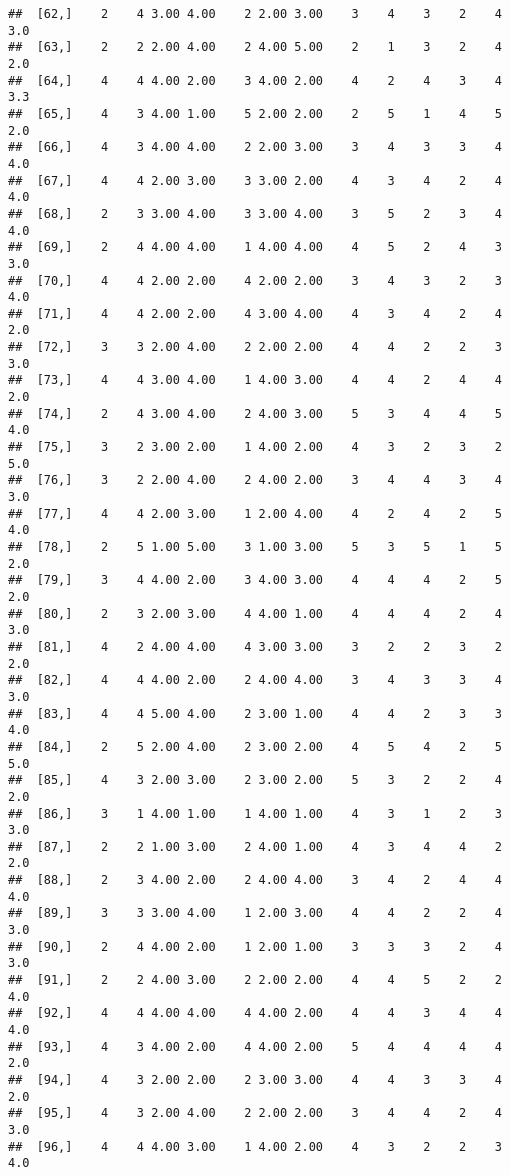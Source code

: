 \documentclass[]{article}
\begin{document}
\begin{verbatim}
##  [62,]    2    4 3.00 4.00    2 2.00 3.00    3    4    3    2    4  3.0
##  [63,]    2    2 2.00 4.00    2 4.00 5.00    2    1    3    2    4  2.0
##  [64,]    4    4 4.00 2.00    3 4.00 2.00    4    2    4    3    4  3.3
##  [65,]    4    3 4.00 1.00    5 2.00 2.00    2    5    1    4    5  2.0
##  [66,]    4    3 4.00 4.00    2 2.00 3.00    3    4    3    3    4  4.0
##  [67,]    4    4 2.00 3.00    3 3.00 2.00    4    3    4    2    4  4.0
##  [68,]    2    3 3.00 4.00    3 3.00 4.00    3    5    2    3    4  4.0
##  [69,]    2    4 4.00 4.00    1 4.00 4.00    4    5    2    4    3  3.0
##  [70,]    4    4 2.00 2.00    4 2.00 2.00    3    4    3    2    3  4.0
##  [71,]    4    4 2.00 2.00    4 3.00 4.00    4    3    4    2    4  2.0
##  [72,]    3    3 2.00 4.00    2 2.00 2.00    4    4    2    2    3  3.0
##  [73,]    4    4 3.00 4.00    1 4.00 3.00    4    4    2    4    4  2.0
##  [74,]    2    4 3.00 4.00    2 4.00 3.00    5    3    4    4    5  4.0
##  [75,]    3    2 3.00 2.00    1 4.00 2.00    4    3    2    3    2  5.0
##  [76,]    3    2 2.00 4.00    2 4.00 2.00    3    4    4    3    4  3.0
##  [77,]    4    4 2.00 3.00    1 2.00 4.00    4    2    4    2    5  4.0
##  [78,]    2    5 1.00 5.00    3 1.00 3.00    5    3    5    1    5  2.0
##  [79,]    3    4 4.00 2.00    3 4.00 3.00    4    4    4    2    5  2.0
##  [80,]    2    3 2.00 3.00    4 4.00 1.00    4    4    4    2    4  3.0
##  [81,]    4    2 4.00 4.00    4 3.00 3.00    3    2    2    3    2  2.0
##  [82,]    4    4 4.00 2.00    2 4.00 4.00    3    4    3    3    4  3.0
##  [83,]    4    4 5.00 4.00    2 3.00 1.00    4    4    2    3    3  4.0
##  [84,]    2    5 2.00 4.00    2 3.00 2.00    4    5    4    2    5  5.0
##  [85,]    4    3 2.00 3.00    2 3.00 2.00    5    3    2    2    4  2.0
##  [86,]    3    1 4.00 1.00    1 4.00 1.00    4    3    1    2    3  3.0
##  [87,]    2    2 1.00 3.00    2 4.00 1.00    4    3    4    4    2  2.0
##  [88,]    2    3 4.00 2.00    2 4.00 4.00    3    4    2    4    4  4.0
##  [89,]    3    3 3.00 4.00    1 2.00 3.00    4    4    2    2    4  3.0
##  [90,]    2    4 4.00 2.00    1 2.00 1.00    3    3    3    2    4  3.0
##  [91,]    2    2 4.00 3.00    2 2.00 2.00    4    4    5    2    2  4.0
##  [92,]    4    4 4.00 4.00    4 4.00 2.00    4    4    3    4    4  4.0
##  [93,]    4    3 4.00 2.00    4 4.00 2.00    5    4    4    4    4  2.0
##  [94,]    4    3 2.00 2.00    2 3.00 3.00    4    4    3    3    4  2.0
##  [95,]    4    3 2.00 4.00    2 2.00 2.00    3    4    4    2    4  3.0
##  [96,]    4    4 4.00 3.00    1 4.00 2.00    4    3    2    2    3  4.0

\end{verbatim}
\end{document}
